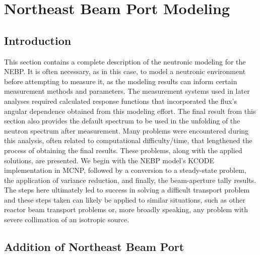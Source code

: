 
\cleardoublepage


\chapter{Northeast Beam Port Modeling}


\section{Introduction}

This section contains a complete description of the neutronic modeling for the NEBP.
It is often necessary, as in this case, to model a neutronic environment before attempting to measure it, as the modeling results can inform certain measurement methods and parameters.
The measurement systems used in later analyses required calculated response functions that incorporated the flux's angular dependence obtained from this modeling effort.
The final result from this section also provides the default spectrum to be used in the unfolding of the neutron spectrum after measurement.
Many problems were encountered during this analysis, often related to computational difficulty/time, that lengthened the process of obtaining the final results.
These problems, along with the applied solutions, are presented.
We begin with the NEBP model's KCODE implementation in MCNP, followed by a conversion to a steady-state problem, the application of variance reduction, and finally, the beam-aperture tally results.
The steps here ultimately led to success in solving a difficult transport problem and these steps taken can likely be applied to similar situations, such as other reactor beam transport problems or, more broadly speaking, any problem with severe collimation of an isotropic source.

\section{Addition of Northeast Beam Port}



